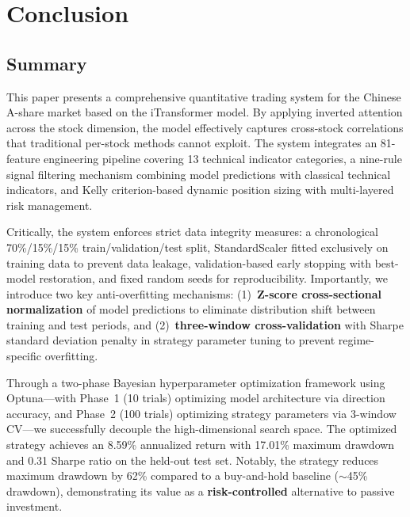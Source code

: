 \documentclass[12pt, a4paper]{article}
\begin{document}
\section{Conclusion} \label{sec:conclusion}

\subsection{Summary}

This paper presents a comprehensive quantitative trading system for the Chinese A-share market based on the iTransformer model. By applying inverted attention across the stock dimension, the model effectively captures cross-stock correlations that traditional per-stock methods cannot exploit. The system integrates an 81-feature engineering pipeline covering 13 technical indicator categories, a nine-rule signal filtering mechanism combining model predictions with classical technical indicators, and Kelly criterion-based dynamic position sizing with multi-layered risk management.

Critically, the system enforces strict data integrity measures: a chronological 70\%/15\%/15\% train/validation/test split, StandardScaler fitted exclusively on training data to prevent data leakage, validation-based early stopping with best-model restoration, and fixed random seeds for reproducibility. Importantly, we introduce two key anti-overfitting mechanisms: (1)~\textbf{Z-score cross-sectional normalization} of model predictions to eliminate distribution shift between training and test periods, and (2)~\textbf{three-window cross-validation} with Sharpe standard deviation penalty in strategy parameter tuning to prevent regime-specific overfitting.

Through a two-phase Bayesian hyperparameter optimization framework using Optuna---with Phase~1 (10 trials) optimizing model architecture via direction accuracy, and Phase~2 (100 trials) optimizing strategy parameters via 3-window CV---we successfully decouple the high-dimensional search space. The optimized strategy achieves an 8.59\% annualized return with 17.01\% maximum drawdown and 0.31 Sharpe ratio on the held-out test set. Notably, the strategy reduces maximum drawdown by 62\% compared to a buy-and-hold baseline ($\sim$45\% drawdown), demonstrating its value as a \textbf{risk-controlled} alternative to passive investment.
\end{document}
